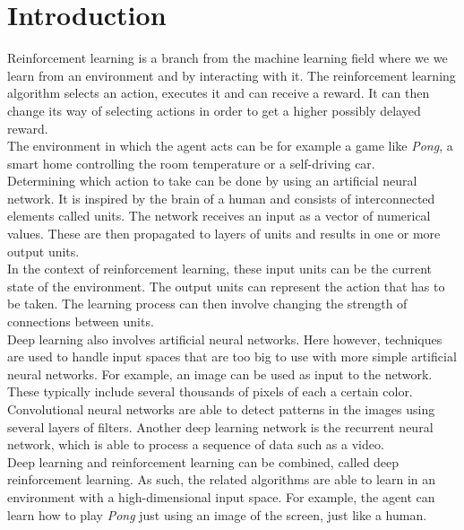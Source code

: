 \section{Introduction}

Reinforcement learning is a branch from the machine learning field where we we learn from an environment and by interacting with it. The reinforcement learning algorithm selects an action, executes it and can receive a reward. It can then change its way of selecting actions in order to get a higher possibly delayed reward.\\
The environment in which the agent acts can be for example a game like \textit{Pong}, a smart home controlling the room temperature or a self-driving car.\\

Determining which action to take can be done by using an artificial neural network. It is inspired by the brain of a human and consists of interconnected elements called units. The network receives an input as a vector of numerical values. These are then propagated to layers of units and results in one or more output units.\\
In the context of reinforcement learning, these input units can be the current state of the environment. The output units can represent the action that has to be taken. The learning process can then involve changing the strength of connections between units.\\

Deep learning also involves artificial neural networks. Here however, techniques are used to handle input spaces that are too big to use with more simple artificial neural networks. For example, an image can be used as input to the network. These typically include several thousands of pixels of each a certain color. Convolutional neural networks are able to detect patterns in the images using several layers of filters. Another deep learning network is the recurrent neural network, which is able to process a sequence of data such as a video.\\

Deep learning and reinforcement learning can be combined, called deep reinforcement learning. As such, the related algorithms are able to learn in an environment with a high-dimensional input space. For example, the agent can learn how to play \textit{Pong} just using an image of the screen, just like a human.\\

